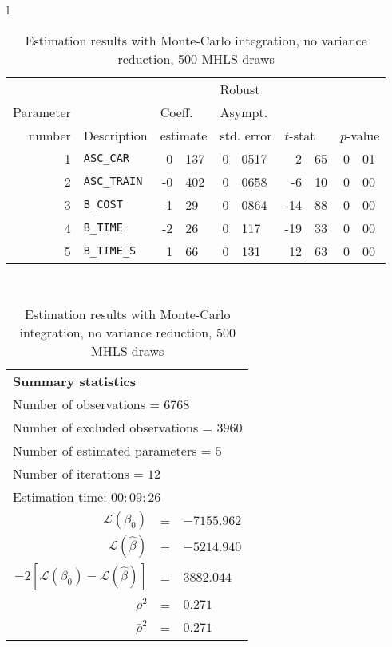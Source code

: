 \documentclass[12pt,a4paper]{article}
\begin{document}
\begin{table}[htb]
  \begin{tabular}{l}
\begin{tabular}{rlr@{.}lr@{.}lr@{.}lr@{.}l}
         &                       &   \multicolumn{2}{l}{}    & \multicolumn{2}{l}{Robust}  &     \multicolumn{4}{l}{}   \\
Parameter &                       &   \multicolumn{2}{l}{Coeff.}      & \multicolumn{2}{l}{Asympt.}  &     \multicolumn{4}{l}{}   \\
number &  Description                     &   \multicolumn{2}{l}{estimate}      & \multicolumn{2}{l}{std. error}  &   \multicolumn{2}{l}{$t$-stat}  &   \multicolumn{2}{l}{$p$-value}   \\

\hline

1 & \lstinline$ASC_CAR$ & 0&137 & 0&0517 & 2&65 & 0&01\\
2 & \lstinline$ASC_TRAIN$ & -0&402 & 0&0658 & -6&10 & 0&00\\
3 & \lstinline$B_COST$ & -1&29 & 0&0864 & -14&88 & 0&00\\
4 & \lstinline$B_TIME$ & -2&26 & 0&117 & -19&33 & 0&00\\
5 & \lstinline$B_TIME_S$ & 1&66 & 0&131 & 12&63 & 0&00\\
\hline
\end{tabular}
\\
\begin{tabular}{rcl}
\multicolumn{3}{l}{\bf Summary statistics}\\
\multicolumn{3}{l}{ Number of observations = $6768$} \\
\multicolumn{3}{l}{ Number of excluded observations = $3960$} \\
\multicolumn{3}{l}{ Number of estimated  parameters = $5$} \\
\multicolumn{3}{l}{ Number of iterations = $12$} \\
\multicolumn{3}{l}{ Estimation time: $00:09:26$} \\
 $\mathcal{L}(\beta_0)$ &=&  $-7155.962$ \\
 $\mathcal{L}(\hat{\beta})$ &=& $-5214.940 $  \\
 $-2[\mathcal{L}(\beta_0) -\mathcal{L}(\hat{\beta})]$ &=& $3882.044$ \\
    $\rho^2$ &=&   $0.271$ \\
    $\bar{\rho}^2$ &=&    $0.271$ \\
\end{tabular}
  \end{tabular}
\caption{\label{tab:estMC500}Estimation results with Monte-Carlo
  integration, no variance reduction, 500 MHLS draws}
\end{table}
\end{document}
